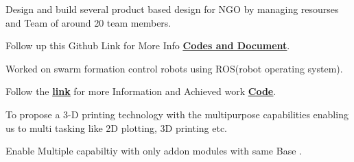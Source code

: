 \documentclass[]{font}
\begin{document}
\begin{minipage}[t]{0.69\textwidth}
\begin{tightemize}
\item Design and build several product based design for NGO by managing resourses and Team of around 20 team members.
\item Follow up this Github Link for More Info \textbf{\href{https://github.com/pranav083/Tinkering_project}{\underline{Codes and Document}}}.	
\end{tightemize}
\sectionsep


\begin{tightemize}
\item Worked on swarm formation control robots using ROS(robot operating system).
\item Follow the \textbf{\href{http://crip.ml}{\underline{link}}} for more  Information and Achieved work \textbf{\href{https://github.com/pranav083/ROS_work_earlier_nrf}{\underline{Code}}}.	
\end{tightemize}
\sectionsep

\begin{tightemize}
\item To propose a 3-D printing technology with the multipurpose
capabilities enabling us to multi tasking like 2D plotting, 3D printing etc.
\item Enable Multiple capabiltiy with only addon modules with same Base .
\end{tightemize}
\sectionsep



\end{minipage}
\end{document}
